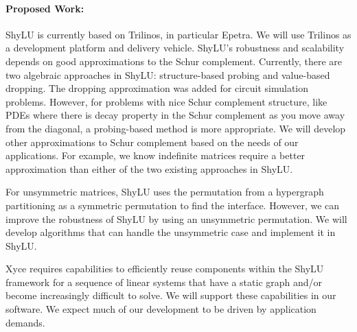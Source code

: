 \documentclass[10pt]{amsart}
\begin{document}
\paragraph{\bf Proposed Work:}
ShyLU is currently based on Trilinos, in particular Epetra.
We will use Trilinos as a development platform and delivery vehicle.
ShyLU's robustness and scalability depends on good
approximations to the Schur complement. Currently, there
are two algebraic approaches in ShyLU: 
structure-based probing and value-based dropping. The dropping approximation
was added for circuit simulation problems. However, for problems
with nice Schur complement structure, like PDEs where there is decay
property in the Schur complement as you move away from the diagonal,
a probing-based method is more appropriate. We will develop other
approximations to Schur complement based on the needs of our applications. For
example, we know indefinite matrices require a better approximation than either
of the two existing approaches in ShyLU.

For unsymmetric matrices, ShyLU
uses the permutation from a hypergraph partitioning as a symmetric
permutation to find the interface. However, we can improve the robustness
of ShyLU by
using an unsymmetric permutation. We will develop algorithms that can handle
the unsymmetric case and implement it in ShyLU.

Xyce requires capabilities to efficiently
reuse components within the ShyLU framework for a sequence of linear systems that
have a static graph and/or become increasingly difficult to solve. We will
support these capabilities in our software.
We expect much of our development to be driven by application demands.
\end{document}
